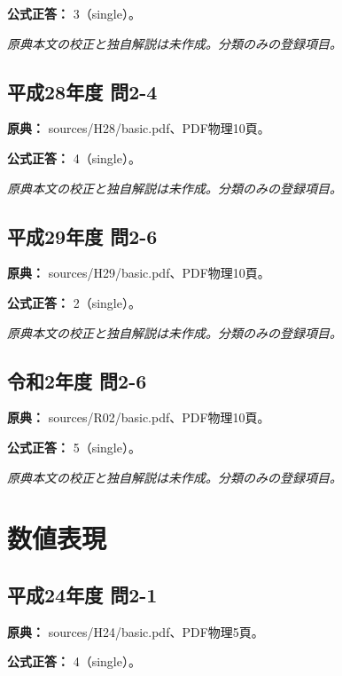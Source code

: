 \textbf{公式正答：} 3（single）。

\par\textit{原典本文の校正と独自解説は未作成。分類のみの登録項目。}

\subsection{平成28年度 問2-4}
\label{q:h28-reg-basic-2-4}

\noindent\textbf{原典：} sources/H28/basic.pdf、PDF物理10頁。

\textbf{公式正答：} 4（single）。

\par\textit{原典本文の校正と独自解説は未作成。分類のみの登録項目。}

\subsection{平成29年度 問2-6}
\label{q:h29-reg-basic-2-6}

\noindent\textbf{原典：} sources/H29/basic.pdf、PDF物理10頁。

\textbf{公式正答：} 2（single）。

\par\textit{原典本文の校正と独自解説は未作成。分類のみの登録項目。}

\subsection{令和2年度 問2-6}
\label{q:r02-reg-basic-2-6}

\noindent\textbf{原典：} sources/R02/basic.pdf、PDF物理10頁。

\textbf{公式正答：} 5（single）。

\par\textit{原典本文の校正と独自解説は未作成。分類のみの登録項目。}

\section{数値表現}

\subsection{平成24年度 問2-1}
\label{q:h24-reg-basic-2-1}

\noindent\textbf{原典：} sources/H24/basic.pdf、PDF物理5頁。

\textbf{公式正答：} 4（single）。

